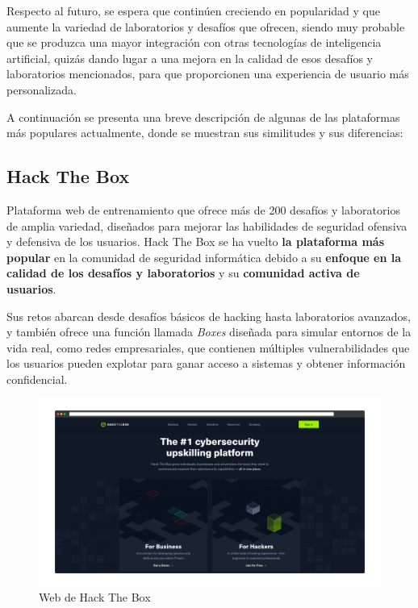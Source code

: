         Respecto al futuro, se espera que continúen creciendo en popularidad y que aumente la variedad de laboratorios y desafíos que ofrecen, siendo muy probable que se produzca una mayor integración con otras tecnologías de inteligencia artificial, quizás dando lugar a una mejora en la calidad de esos desafíos y laboratorios mencionados, para que proporcionen una experiencia de usuario más personalizada.
        
        A continuación se presenta una breve descripción de algunas de las plataformas más populares actualmente, donde se muestran sus similitudes y sus diferencias:
        
        \newpage
        
        
        \subsection{Hack The Box}
        
            Plataforma web de entrenamiento que ofrece más de 200 desafíos y laboratorios de amplia variedad, diseñados para mejorar las habilidades de seguridad ofensiva y defensiva de los usuarios. Hack The Box se ha vuelto \textbf{la plataforma más popular} en la comunidad de seguridad informática debido a su \textbf{enfoque en la calidad de los desafíos y laboratorios} y su \textbf{comunidad activa de usuarios}.
            
            Sus retos abarcan desde desafíos básicos de hacking hasta laboratorios avanzados, y también ofrece una función llamada \textit{Boxes} diseñada para simular entornos de la vida real, como redes empresariales, que contienen múltiples vulnerabilidades que los usuarios pueden explotar para ganar acceso a sistemas y obtener información confidencial.
            
            \begin{figure}[h]
                \centering

                \includegraphics[width=\textwidth]{images/Capturas/Web de HTB.png}

                \caption{Web de Hack The Box}
                \label{fig:HTB-web}
            \end{figure}
            
